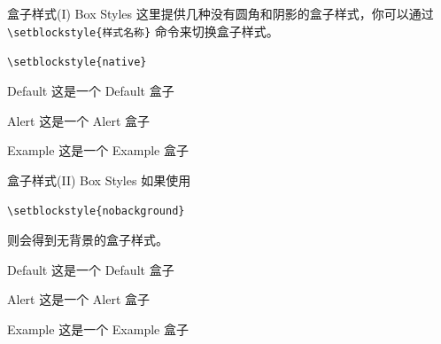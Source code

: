 \documentclass[10pt,aspectratio=169,fontset=none]{ctexbeamer}
\begin{document}
    \begin{frame}{盒子样式(I) Box Styles}
        这里提供几种没有圆角和阴影的盒子样式，你可以通过 \texttt{\textcolor{primary}{\textbackslash setblockstyle}\{样式名称\}} 命令来切换盒子样式。

        \begin{center}
            \texttt{\textcolor{primary}{\textbackslash setblockstyle}\{native\}}
        \end{center}

        \centering
        \begin{minipage}[b]{0.5\textwidth}
            \begin{block}{Default}
                这是一个 Default 盒子
            \end{block}
            \begin{alertblock}{Alert}
                这是一个 Alert 盒子
            \end{alertblock}
            \begin{exampleblock}{Example}
                这是一个 Example 盒子
            \end{exampleblock} 
        \end{minipage}

    \end{frame}

    \begin{frame}{盒子样式(II) Box Styles}
    如果使用    

        \begin{center}
            \texttt{\textcolor{primary}{\textbackslash setblockstyle}\{nobackground\}}
        \end{center}
    则会得到无背景的盒子样式。
        \centering
        \begin{minipage}[b]{0.5\textwidth}
            \begin{block}{Default}
                这是一个 Default 盒子
            \end{block}
            \begin{alertblock}{Alert}
                这是一个 Alert 盒子
            \end{alertblock}
            \begin{exampleblock}{Example}
                这是一个 Example 盒子
            \end{exampleblock}       
        \end{minipage}

    \end{frame}
\end{document}
